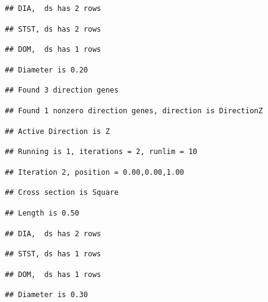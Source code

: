 \documentclass[]{article}
\begin{document}
\begin{verbatim}
## DIA,  ds has 2 rows
\end{verbatim}

\begin{verbatim}
## STST, ds has 2 rows
\end{verbatim}

\begin{verbatim}
## DOM,  ds has 1 rows
\end{verbatim}

\begin{verbatim}
## Diameter is 0.20
\end{verbatim}

\begin{verbatim}
## Found 3 direction genes
\end{verbatim}

\begin{verbatim}
## Found 1 nonzero direction genes, direction is DirectionZ
\end{verbatim}

\begin{verbatim}
## Active Direction is Z
\end{verbatim}

\begin{verbatim}
## Running is 1, iterations = 2, runlim = 10
\end{verbatim}

\begin{verbatim}
## Iteration 2, position = 0.00,0.00,1.00
\end{verbatim}

\begin{verbatim}
## Cross section is Square
\end{verbatim}

\begin{verbatim}
## Length is 0.50
\end{verbatim}

\begin{verbatim}
## DIA,  ds has 2 rows
\end{verbatim}

\begin{verbatim}
## STST, ds has 1 rows
\end{verbatim}

\begin{verbatim}
## DOM,  ds has 1 rows
\end{verbatim}

\begin{verbatim}
## Diameter is 0.30
\end{verbatim}
\end{document}
